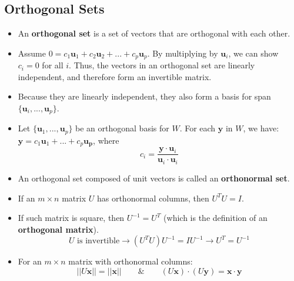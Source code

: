 \documentclass[a4paper,12pt]{article}
\begin{document}
\subsection{Orthogonal Sets}
\begin{itemize}
\item An \textbf{orthogonal set} is a set of vectors that are orthogonal with each other.
\item Assume $0 = c_1\mathbf{u}_1 + c_2\mathbf{u}_2 + ...  + c_p\mathbf{u}_p$. By multiplying by $\mathbf{u}_i$, we can show $c_i=0$ for all $i$. Thus, the vectors in an orthogonal set are linearly independent, and therefore form an invertible matrix.
\item Because they are linearly independent, they also form a basis for span$\{\mathbf{u}_i,...,\mathbf{u}_p\}$.
\item Let $\{\mathbf{u}_1,...,\mathbf{u}_p\}$ be an orthogonal basis for $W$. For each $\mathbf{y}$ in $W$, we have: $\mathbf{y} = c_1\mathbf{u}_1 + ... + c_p\mathbf{u_p}$, where $$c_i = \frac{\mathbf{y}\cdot\mathbf{u}_i}{\mathbf{u}_i\cdot\mathbf{u}_i}$$ 
\item An orthogonal set composed of unit vectors is called an \textbf{orthonormal set}.
\item If an $m\times n$ matrix $U$ has orthonormal columns, then $U^TU=I$.
\item If such matrix is square, then $U^{-1}=U^T$ (which is the definition of an \textbf{orthogonal matrix}).
$$U\text{ is invertible} \rightarrow (U^TU)U^{-1}=IU^{-1} \rightarrow U^T=U^{-1}$$
\item For an $m\times n$ matrix with orthonormal columns:
$$||U\mathbf{x}|| = ||\mathbf{x}|| \qquad \& \qquad (U\mathbf{x})\cdot(U\mathbf{y})=\mathbf{x}\cdot\mathbf{y}$$
\end{itemize}
\end{document}
